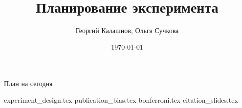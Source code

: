 \documentclass[handout,12pt]{beamer}
\title{Планирование эксперимента}
\author[Георгий Калашнов, Ольга Сучкова]{Георгий Калашнов, Ольга Сучкова}
\date{\today}
\begin{document}
\begin{frame}
  \titlepage
\end{frame}


\begin{frame}{План на сегодня} 
\tableofcontents
\end{frame}


{experiment_design.tex}
{publication_bias.tex}
{bonferroni.tex}
{citation_slides.tex}
\end{document}
